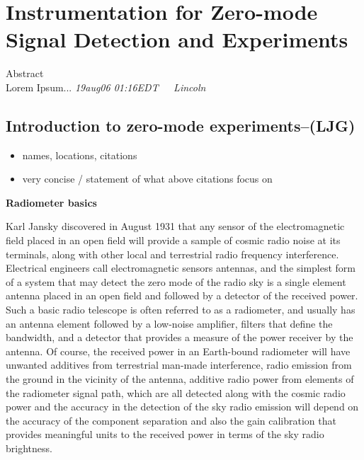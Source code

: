 %
%
\chapter{Instrumentation for Zero-mode Signal Detection and Experiments}

\begin{bf}
\author{L. J. Greenhill (Center for Astrophysics), R. Subrahmanyan (Raman Research Institute)}  
  
Abstract\\
Lorem Ipsum...
\emph{19aug06 01:16EDT~~~Lincoln}

\end{bf}


\section{Introduction to zero-mode experiments--(LJG)}

\begin{itemize}
\item
  names, locations, citations
\item
  very concise / statement of what above citations focus on
\end{itemize}

\textbf{Radiometer basics}

Karl Jansky discovered in August 1931 that any sensor of the electromagnetic field placed in an open field will provide a sample of cosmic radio noise at its terminals, along with other local and terrestrial radio frequency interference.  Electrical engineers call electromagnetic sensors antennas, and the simplest form of a system that may detect the zero mode of the radio sky is a single element antenna placed in an open field and followed by a detector of the received power. Such a basic radio telescope is often referred to as a radiometer, and usually has an antenna element followed by a low-noise amplifier, filters that define the bandwidth, and a detector that provides a measure of the power receiver by the antenna.  Of course, the received power in an Earth-bound radiometer will have unwanted additives from terrestrial man-made interference, radio emission from the ground in the vicinity of the antenna, additive radio power from elements of the radiometer signal path, which are all detected along with the cosmic radio power and the accuracy in the detection of the sky radio emission will depend on the accuracy of the component separation and also the gain calibration that provides meaningful units to the received power in terms of the sky radio brightness.

